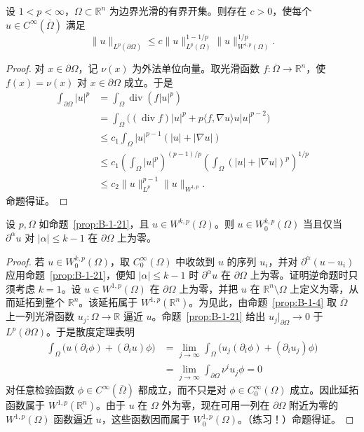 \begin{proposition}\label{prop:B-1-21}
设 $1<p<\infty$，$\Omega\subset\mathbb R^n$ 为边界光滑的有界开集。则存在 $c>0$，使每个 $u\in C^\infty(\overline\Omega)$ 满足
\[
\|u\|_{L^p(\partial\Omega)}
\le c\|u\|_{L^p(\Omega)}^{1-1/p}\|u\|_{W^{1,p}(\Omega)}^{1/p}.
\]
\end{proposition}
\begin{proof}
对 $x\in\partial\Omega$，记 $\nu(x)$ 为外法单位向量。取光滑函数 $f:\overline\Omega\to\mathbb R^n$，使 $f(x)=\nu(x)$ 对 $x\in\partial\Omega$ 成立。于是
\begin{align*}
\int_{\partial\Omega}|u|^p
&=\int_\Omega\operatorname{div}(f|u|^p)\\
&=\int_\Omega\bigl((\operatorname{div}f)|u|^p
+p\langle f,\nabla u\rangle u|u|^{p-2}\bigr)\\
&\le c_1\int_\Omega|u|^{p-1}(|u|+|\nabla u|)\\
&\le c_1\left(\int_\Omega|u|^p\right)^{(p-1)/p}
\left(\int_\Omega(|u|+|\nabla u|)^p\right)^{1/p}\\
&\le c_2\|u\|_{L^p}^{p-1}\|u\|_{W^{1,p}}.
\end{align*}
命题得证。
\end{proof}
\begin{proposition}\label{prop:B-1-22}
设 $p,\Omega$ 如命题~\ref{prop:B-1-21}，且 $u\in W^{k,p}(\Omega)$。则 $u\in W_0^{k,p}(\Omega)$ 当且仅当 $\partial^\alpha u$ 对 $|\alpha|\le k-1$ 在 $\partial\Omega$ 上为零。
\end{proposition}
\begin{proof}
若 $u\in W_0^{k,p}(\Omega)$，取 $C_0^\infty(\Omega)$ 中收敛到 $u$ 的序列 $u_i$，并对 $\partial^\alpha(u-u_i)$ 应用命题~\ref{prop:B-1-21}，便知 $|\alpha|\le k-1$ 时 $\partial^\alpha u$ 在 $\partial\Omega$ 上为零。证明逆命题时只须考虑 $k=1$。设 $u\in W^{1,p}(\Omega)$ 在 $\partial\Omega$ 上为零，并把 $u$ 在 $\mathbb R^n\setminus\Omega$ 上定义为零，从而延拓到整个 $\mathbb R^n$。该延拓属于 $W^{1,p}(\mathbb R^n)$。为见此，由命题~\ref{prop:B-1-4} 取 $\overline\Omega$ 上一列光滑函数 $u_j:\Omega\to\mathbb R$ 逼近 $u$。命题~\ref{prop:B-1-21} 给出 $u_j|_{\partial\Omega}\to0$ 于 $L^p(\partial\Omega)$。于是散度定理表明
\begin{align*}
\int_\Omega\bigl(u(\partial_i\phi)+(\partial_i u)\phi\bigr)
&=\lim_{j\to\infty}\int_\Omega
\bigl(u_j(\partial_i\phi)+(\partial_i u_j)\phi\bigr)\\
&=\lim_{j\to\infty}\int_{\partial\Omega}\nu^i u_j\phi=0
\end{align*}
对任意检验函数 $\phi\in C^\infty(\overline\Omega)$ 都成立，而不只是对 $\phi\in C_0^\infty(\Omega)$ 成立。因此延拓函数属于 $W^{1,p}(\mathbb R^n)$。由于 $u$ 在 $\Omega$ 外为零，现在可用一列在 $\partial\Omega$ 附近为零的 $W^{1,p}(\Omega)$ 函数逼近 $u$，这些函数因而属于 $W_0^{1,p}(\Omega)$。（练习！）命题得证。
\end{proof}

